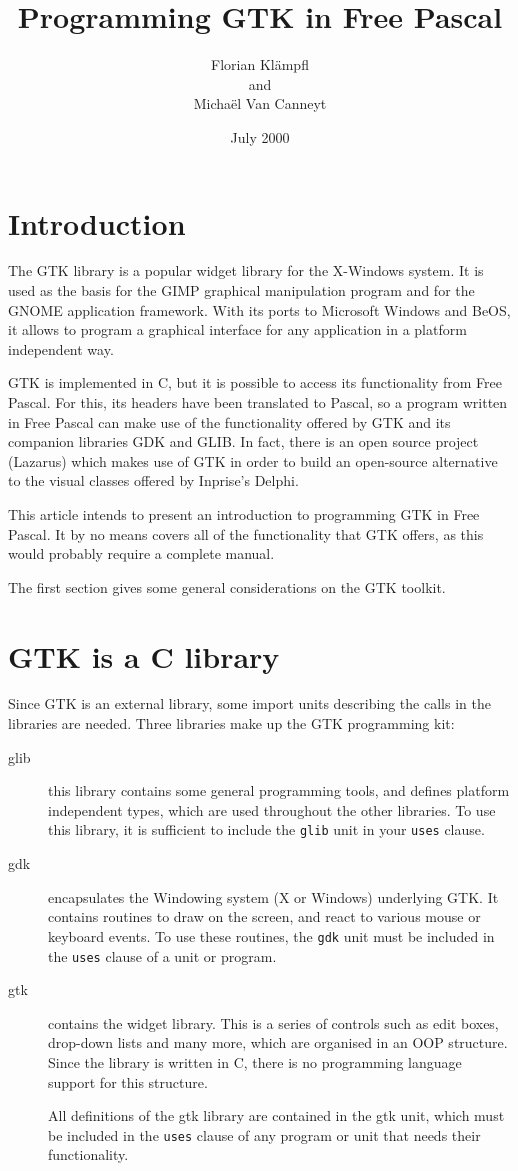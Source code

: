 \documentclass[10pt]{article}
\begin{document}
\title{Programming GTK in Free Pascal}
\author{Florian Kl\"ampfl\\and\\Micha\"el Van Canneyt}
\date{July 2000}
\maketitle
\section{Introduction}
The GTK library is a popular widget library for the X-Windows system.
It is used as the basis for the GIMP graphical manipulation program 
and for the GNOME application framework. With its ports to Microsoft 
Windows and BeOS, it allows to program a graphical interface for any
application in a platform independent way.

GTK is implemented in C, but it is possible to access its functionality from
Free Pascal. For this, its headers have been translated to Pascal,
so a program written in Free Pascal can make use of the functionality 
offered by GTK and its companion libraries GDK and GLIB. In fact, there is
an open source project (Lazarus) which makes use of GTK in order to build
an open-source alternative to the visual classes offered by Inprise's
Delphi.

This article intends to present an introduction to programming GTK in
Free Pascal. It by no means covers all of the functionality that GTK 
offers, as this would probably require a complete manual.

The first section gives some general considerations on the GTK toolkit.

\section{GTK is a C library}
Since GTK is an external library, some import units describing the calls in
the libraries are needed. Three libraries make up the GTK programming kit:
\begin{description}
\item[glib] this library contains some general programming tools, and
defines platform independent types, which are used throughout the other
libraries. To use this library, it is sufficient to include the 
\lstinline|glib| unit in your \lstinline|uses| clause.
\item[gdk] encapsulates the Windowing system (X or Windows) underlying GTK. 
It contains routines to draw on the screen, and react to various mouse or 
keyboard events. To use these
routines, the \lstinline|gdk| unit must be included in the \lstinline|uses|
 clause of a unit or program.
\item[gtk] contains the widget library. This is a series of controls such
as edit boxes, drop-down lists and many more, which are organised in an OOP
structure. Since the library is written in C, there is no programming 
language support for this structure.

All definitions of the gtk library are contained in the gtk unit, which
must be included in the \lstinline|uses| clause of any program or unit that needs their
functionality.
\end{description}
\end{document}

